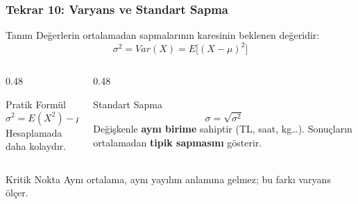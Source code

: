\documentclass[light]{lutbeamer}
\begin{document}
\begin{frame}[fragile]
    \frametitle{Tekrar 10: Varyans ve Standart Sapma}
    \scriptsize
    \begin{block}{Tanım}
        Değerlerin ortalamadan sapmalarının karesinin beklenen değeridir:
        \[
        \sigma^2 = Var(X) = E\bigl[(X - \mu)^2\bigr]
        \]
    \end{block}

    \begin{columns}[T]
        \begin{column}{0.48\textwidth}
            \begin{block}{Pratik Formül}
                \[
                \sigma^2 = E(X^2) - \mu^2
                \]
                Hesaplamada daha kolaydır.
            \end{block}
        \end{column}
        \begin{column}{0.48\textwidth}
            \begin{exampleblock}{Standart Sapma}
                \[
                \sigma = \sqrt{\sigma^2}
                \]
                Değişkenle \textbf{aynı birime} sahiptir (TL, saat, kg\dots). Sonuçların ortalamadan \textbf{tipik sapmasını} gösterir.
            \end{exampleblock}
        \end{column}
    \end{columns}

    \begin{alertblock}{Kritik Nokta}
        Aynı ortalama, aynı yayılım anlamına gelmez; bu farkı varyans ölçer.
    \end{alertblock}
\end{frame}
\end{document}
